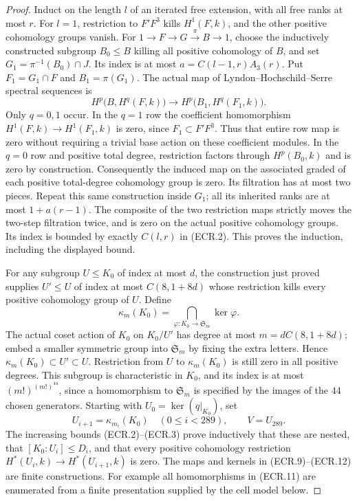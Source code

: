 \begin{proof}
Induct on the length $l$ of an iterated free extension, with all
free ranks at most $r$.  For $l=1$, restriction to $F'F^3$ kills
$H^1(F,k)$, and the other positive cohomology groups vanish.
For $1\to F\to G\xrightarrow{\pi}B\to1$, choose the inductively
constructed subgroup $B_0\leq B$ killing all positive cohomology of
$B$, and set $G_1=\pi^{-1}(B_0)\cap J$.
Its index is at most $a=C(l-1,r)A_3(r)$.
Put $F_1=G_1\cap F$ and $B_1=\pi(G_1)$.
The actual map of Lyndon--Hochschild--Serre spectral sequences is
\[
 H^p\bigl(B,H^q(F,k)\bigr)
       \longrightarrow H^p\bigl(B_1,H^q(F_1,k)\bigr).
                                                               \tag{ECR.10}
\]
Only $q=0,1$ occur.  In the $q=1$ row the coefficient homomorphism
$H^1(F,k)\to H^1(F_1,k)$ is zero, since $F_1\subset F'F^3$.
Thus that entire row map is zero without requiring a trivial base
action on these coefficient modules.  In the $q=0$ row and positive
total degree, restriction factors through $H^p(B_0,k)$ and is zero
by construction.  Consequently the induced map on the associated
graded of each positive total-degree cohomology group is zero.
Its filtration has at most two pieces.  Repeat this same construction
inside $G_1$; all its inherited ranks are at most $1+a(r-1)$.
The composite of the two restriction maps strictly moves the
two-step filtration twice, and is zero on the actual positive
cohomology groups.  Its index is bounded by exactly $C(l,r)$ in
(ECR.2).  This proves the induction, including the displayed bound.

For any subgroup $U\leq K_0$ of index at most $d$, the construction
just proved supplies $U'\leq U$ of index at most $C(8,1+8d)$ whose
restriction kills every positive cohomology group of $U$.
Define
\[
 \kappa_m(K_0)=\bigcap_{\varphi:K_0\to\mathfrak S_m}\ker\varphi.
                                                               \tag{ECR.11}
\]
The actual coset action of $K_0$ on $K_0/U'$ has degree at most
$m=dC(8,1+8d)$; embed a smaller symmetric group into
$\mathfrak S_m$ by fixing the extra letters.  Hence
$\kappa_m(K_0)\subset U'\subset U$.  Restriction from $U$ to
$\kappa_m(K_0)$ is still zero in all positive degrees.
This subgroup is characteristic in $K_0$, and its index is at most
$(m!)^{(m!)^{44}}$, since a homomorphism to $\mathfrak S_m$ is
specified by the images of the $44$ chosen generators.
Starting with $U_0=\ker(q|_{K_0})$, set
\[
 U_{i+1}=\kappa_{m_i}(K_0)\quad(0\leq i<289),\qquad V=U_{289}.
                                                               \tag{ECR.12}
\]
The increasing bounds (ECR.2)--(ECR.3) prove inductively that these
are nested, that $[K_0:U_i]\leq D_i$, and that every positive
cohomology restriction $H^*(U_i,k)\to H^*(U_{i+1},k)$ is zero.
The maps and kernels in (ECR.9)--(ECR.12) are finite constructions.
For example all homomorphisms in (ECR.11) are enumerated from a
finite presentation supplied by the cell model below.


\end{proof}
